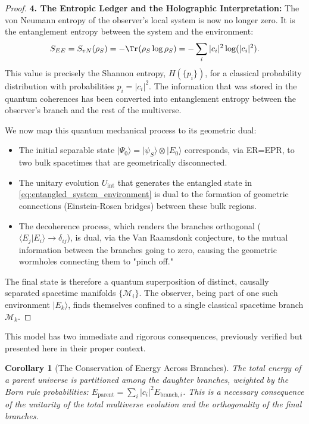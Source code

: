 \documentclass[11pt, letterpaper]{report}
\theoremstyle{plain} %
\newtheorem{corollary}[theorem]{Corollary}
\theoremstyle{definition} %
\theoremstyle{remark} %
\begin{document}
\begin{proof}
\textbf{4. The Entropic Ledger and the Holographic Interpretation:}
The von Neumann entropy of the observer's local system is now no longer zero. It is the entanglement entropy between the system and the environment:
\begin{equation}
    S_{EE} = S_{vN}(\rho_S) = -\Tr(\rho_S \log\rho_S) = -\sum_i |c_i|^2 \log(|c_i|^2).
\end{equation}
This value is precisely the Shannon entropy, $H(\{p_i\})$, for a classical probability distribution with probabilities $p_i=|c_i|^2$. The information that was stored in the quantum coherences has been converted into entanglement entropy between the observer's branch and the rest of the multiverse.

We now map this quantum mechanical process to its geometric dual:
\begin{itemize}
    \item The initial separable state $|\Psi_0\rangle = |\psi_S\rangle \otimes |E_0\rangle$ corresponds, via ER=EPR, to two bulk spacetimes that are geometrically disconnected.
    \item The unitary evolution $U_{\text{int}}$ that generates the entangled state in \cref{eq:entangled_system_environment} is dual to the formation of geometric connections (Einstein-Rosen bridges) between these bulk regions.
    \item The decoherence process, which renders the branches orthogonal ($\langle E_j|E_i\rangle \to \delta_{ij}$), is dual, via the Van Raamsdonk conjecture, to the mutual information between the branches going to zero, causing the geometric wormholes connecting them to "pinch off."
\end{itemize}
The final state is therefore a quantum superposition of distinct, causally separated spacetime manifolds $\{\mathcal{M}_i\}$. The observer, being part of one such environment $|E_k\rangle$, finds themselves confined to a single classical spacetime branch $\mathcal{M}_k$.
\end{proof}

This model has two immediate and rigorous consequences, previously verified but presented here in their proper context.

\begin{corollary}[The Conservation of Energy Across Branches]
The total energy of a parent universe is partitioned among the daughter branches, weighted by the Born rule probabilities: $E_{\text{parent}} = \sum_i |c_i|^2 E_{\text{branch}, i}$. This is a necessary consequence of the unitarity of the total multiverse evolution and the orthogonality of the final branches.
\end{corollary}
\end{document}

